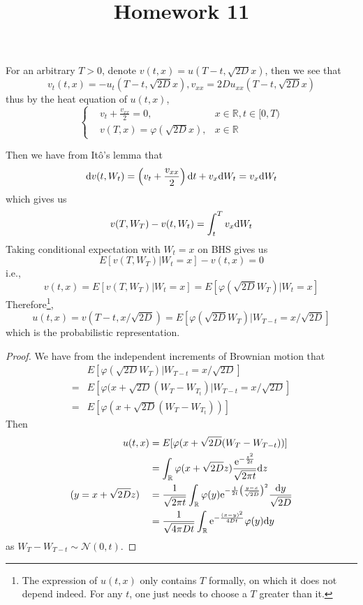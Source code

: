 \documentclass{homework}
\title{Homework 11}
\begin{document}
    \maketitle

    \problem
    \begin{subproblem}
        \item
        For an arbitrary $T>0$, denote $v(t,x)=u(T-t,\sqrt{2D}x)$,
        then we see that
        \[v_t(t,x)=-u_t(T-t,\sqrt{2D}x),v_{xx}=2Du_{xx}(T-t,\sqrt{2D}x)\]
        thus by the heat equation of $u(t,x)$,
        \[\left\{\begin{aligned}
            &v_t+\frac{v_{xx}}{2}=0,&x\in\mathbb R,t\in[0,T)\\
            &v(T,x)=\varphi(\sqrt{2D}x),&x\in\mathbb R
        \end{aligned}\right.\]

        Then we have from It\^o's lemma that
        \[\mathrm d v(t,W_t)=\left(v_t+\frac{v_{xx}}{2}\right)\mathrm d t
        +v_x\mathrm d W_t=v_x\mathrm d W_t\]
        which gives us
        \[v(T,W_T)-v(t,W_t)=\int_t^Tv_x\mathrm d W_t\]
        Taking conditional expectation with $W_t=x$ on BHS gives us
        \[E[v(T,W_T)|W_t=x]-v(t,x)=0\]
        i.e.,
        \[v(t,x)=E[v(T,W_T)|W_t=x]=E[\varphi(\sqrt{2D}W_T)|W_t=x]\]
        Therefore\footnote{The expression of $u(t,x)$ only contains $T$
        formally, on which it does not depend indeed. For any $t$,
        one just needs to choose a $T$ greater than it.},
        \[u(t,x)=v(T-t,x/\sqrt{2D})
        =E[\varphi(\sqrt{2D}W_T)|W_{T-t}=x/\sqrt{2D}]\]
        which is the probabilistic representation. 

        \item
        \begin{proof}
            We have from the independent increments of Brownian motion
            that
            \[\begin{aligned}
                &E[\varphi(\sqrt{2D}W_T)|W_{T-t}=x/\sqrt{2D}]\\
                =&E[\varphi(x+\sqrt{2D}(W_T-W_{T_t})|W_{T-t}=x/\sqrt{2D}]\\
                =&E[\varphi(x+\sqrt{2D}(W_T-W_{T_t}))]
            \end{aligned}\]
            Then
            \[\begin{aligned}
                u(t,x)&=E[\varphi(x+\sqrt{2D}(W_T-W_{T-t}))]\\
                &=\int_{\mathbb R}\varphi(x+\sqrt{2D}z)\frac{\mathrm e^{-\frac{z^2}{2t}}}{\sqrt{2\pi t}}\mathrm d z\\
                (y=x+\sqrt{2D}z)\quad&=\frac{1}{\sqrt{2\pi t}}
                \int_{\mathbb R}\varphi(y)\mathrm e^{-\frac{1}{2t}\left(\frac{y-x}{\sqrt{2D}}\right)^2}
                \frac{\mathrm d y}{\sqrt{2D}}\\
                &=\frac{1}{\sqrt{4\pi Dt}}
                \int_{\mathbb R}\mathrm e^{-\frac{(x-y)^2}{4Dt}}\varphi(y)\mathrm d y
            \end{aligned}\]
            as $W_T-W_{T-t}\sim\mathcal N(0,t)$.
        \end{proof}


\end{subproblem}
\end{document}
